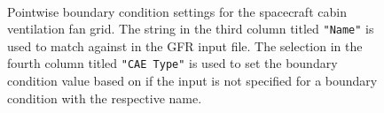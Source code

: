 \begin{figure}[b!]
  \setlength{\imagewidth}{1.0\textwidth}
  \setlength{\imageheight}{0.33\textheight}
  \centering
  \\
  \caption[Pointwise boundary condition settings for the spacecraft
           cabin ventilation fan grid.]%
          {Pointwise boundary condition settings for the spacecraft
           cabin ventilation fan grid.
           The string in the third column titled \texttt{"Name"} is used to
           match against  in the GFR input file.
           The selection in the fourth column titled \texttt{"CAE Type"} is
           used to set the boundary condition value based on
            if the input 
           is not specified for a boundary condition with the respective name.}
  \label{FIG:Files:PW:Spacefan}
\end{figure}


